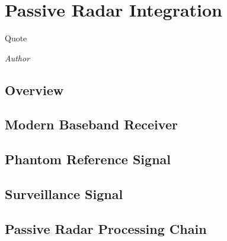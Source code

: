 \documentclass[class=report,11pt,crop=false]{standalone}
\begin{document}
\chapter{Passive Radar Integration}
\epigraph{Quote}%
    {\emph{Author}}

\section{Overview}

\blindmathpaper

\section{Modern Baseband Receiver}
\blindmathpaper

\section{Phantom Reference Signal}
\blindmathpaper

\section{Surveillance Signal}
\blindmathpaper

\section{Passive Radar Processing Chain}
\blindmathpaper











\ifstandalone

\fi
\end{document}
